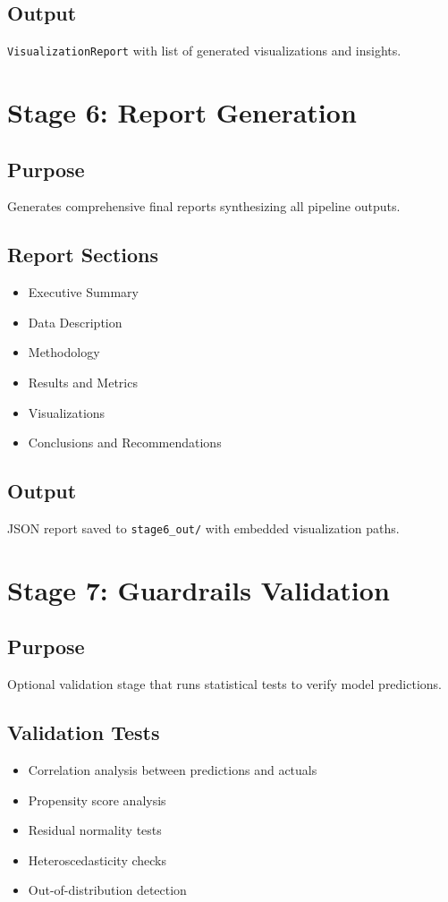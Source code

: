 \documentclass[12pt,a4paper]{report}
\begin{document}
\subsection{Output}
\texttt{VisualizationReport} with list of generated visualizations and insights.

\section{Stage 6: Report Generation}
\subsection{Purpose}
Generates comprehensive final reports synthesizing all pipeline outputs.

\subsection{Report Sections}
\begin{itemize}
    \item Executive Summary
    \item Data Description
    \item Methodology
    \item Results and Metrics
    \item Visualizations
    \item Conclusions and Recommendations
\end{itemize}

\subsection{Output}
JSON report saved to \texttt{stage6\_out/} with embedded visualization paths.

\section{Stage 7: Guardrails Validation}
\subsection{Purpose}
Optional validation stage that runs statistical tests to verify model predictions.

\subsection{Validation Tests}
\begin{itemize}
    \item Correlation analysis between predictions and actuals
    \item Propensity score analysis
    \item Residual normality tests
    \item Heteroscedasticity checks
    \item Out-of-distribution detection
\end{itemize}
\end{document}
